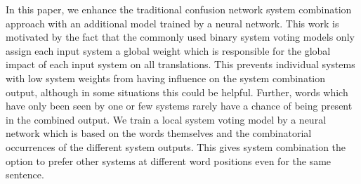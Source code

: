 In this paper, we enhance the traditional confusion network system combination approach with an additional model trained by a neural network. This work is motivated by the fact that the commonly used binary system voting models only assign each input system a global weight which is responsible for the global impact of each input system on all translations. This prevents individual systems with low system weights from having influence on the system combination output, although in some situations this could be helpful. Further, words which have only been seen by one or few systems rarely have a chance of being present in the combined output. We train a local system voting model by a neural network which is based on the words themselves and the combinatorial occurrences of the different system outputs. This gives system combination the option to prefer other systems at different word positions even for the same sentence.
